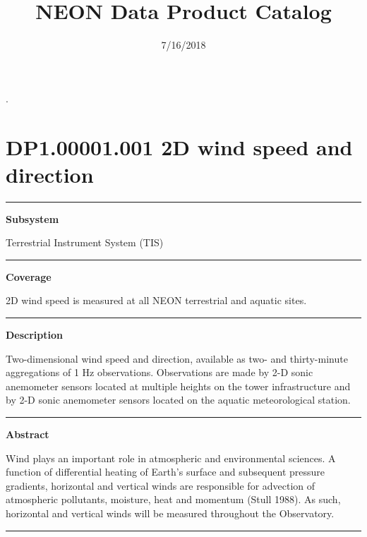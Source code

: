 \documentclass[]{article}
\title{NEON Data Product Catalog}
\author{}
\date{7/16/2018}
\begin{document}
\maketitle

\newpage

.

\section{DP1.00001.001 2D wind speed and
direction}\label{dp1.00001.001-2d-wind-speed-and-direction}

\begin{center}\rule{0.5\linewidth}{\linethickness}\end{center}

\textbf{Subsystem}

Terrestrial Instrument System (TIS)

\begin{center}\rule{0.5\linewidth}{\linethickness}\end{center}

\textbf{Coverage}

2D wind speed is measured at all NEON terrestrial and aquatic sites.

\begin{center}\rule{0.5\linewidth}{\linethickness}\end{center}

\textbf{Description}

Two-dimensional wind speed and direction, available as two- and
thirty-minute aggregations of 1 Hz observations. Observations are made
by 2-D sonic anemometer sensors located at multiple heights on the tower
infrastructure and by 2-D sonic anemometer sensors located on the
aquatic meteorological station.

\begin{center}\rule{0.5\linewidth}{\linethickness}\end{center}

\textbf{Abstract}

Wind plays an important role in atmospheric and environmental sciences.
A function of differential heating of Earth's surface and subsequent
pressure gradients, horizontal and vertical winds are responsible for
advection of atmospheric pollutants, moisture, heat and momentum (Stull
1988). As such, horizontal and vertical winds will be measured
throughout the Observatory.

\begin{center}\rule{0.5\linewidth}{\linethickness}\end{center}
\end{document}
